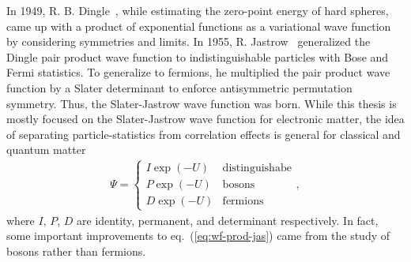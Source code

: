 In 1949, R. B. Dingle~\cite{Dingle1949}, while estimating the zero-point energy of hard spheres, came up with a product of exponential functions as a variational wave function by considering symmetries and limits. In 1955, R. Jastrow~\cite{Jastrow1955} generalized the Dingle pair product wave function to indistinguishable particles with Bose and Fermi statistics. To generalize to fermions, he multiplied the pair product wave function by a Slater determinant to enforce antisymmetric permutation symmetry. Thus, the Slater-Jastrow wave function was born. While this thesis is mostly focused on the Slater-Jastrow wave function for electronic matter, the idea of separating particle-statistics from correlation effects is general for classical and quantum matter %
\begin{align} \label{eq:wf-prod-jas}
\Psi = \left\{\begin{array}{ll}
I \exp(-U) & \text{distinguishabe} \\
P \exp(-U) & \text{bosons} \\
D \exp(-U) & \text{fermions}
\end{array}\right.,
\end{align}
where $I$, $P$, $D$ are identity, permanent, and determinant respectively. In fact, some important improvements to eq.~(\ref{eq:wf-prod-jas}) came from the study of bosons rather than fermions.

